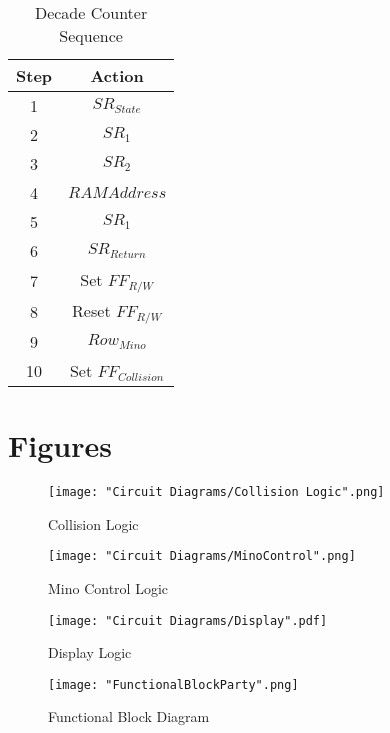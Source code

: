 \documentclass[letterpaper,titlepage,oneside]{article}
\begin{document}
\begin{table}[h!]

\begin{center}

\caption{Decade Counter Sequence}\label{table:Clock}
\begin{tabular}{|c|c|}

\hline 
\rule[-1ex]{0pt}{2.5ex} Step & Action \\ 
\hline 
\rule[-1ex]{0pt}{2.5ex} 1 & $SR_{State}$ \\ 
\hline 
\rule[-1ex]{0pt}{2.5ex} 2 & $SR_{1}$ \\ 
\hline 
\rule[-1ex]{0pt}{2.5ex} 3 & $SR_{2}$ \\ 
\hline 
\rule[-1ex]{0pt}{2.5ex} 4 & $RAM Address$ \\ 
\hline 
\rule[-1ex]{0pt}{2.5ex} 5 & $SR_{1}$ \\ 
\hline 
\rule[-1ex]{0pt}{2.5ex} 6 & $SR_{Return}$ \\ 
\hline 
\rule[-1ex]{0pt}{2.5ex} 7 & Set $FF_{R/W}$ \\ 
\hline 
\rule[-1ex]{0pt}{2.5ex} 8 & Reset $FF_{R/W}$ \\ 
\hline 
\rule[-1ex]{0pt}{2.5ex} 9 & $Row_{Mino}$ \\ 
\hline 
\rule[-1ex]{0pt}{2.5ex} 10 & Set $FF_{Collision}$ \\ 
\hline 


\end{tabular} 
\end{center}
\end{table}


\clearpage
\section{Figures}
\begin{figure}[h!]
\begin{center}
\texttt{[image: "Circuit Diagrams/Collision Logic".png]}
\caption{Collision Logic}
\label{fig:Collision}
\end{center}
\end{figure}

\begin{figure}[h!]
\begin{center}
\texttt{[image: "Circuit Diagrams/MinoControl".png]}
\caption{Mino Control Logic}
\label{fig:Mino Control}
\end{center}
\end{figure}

\begin{figure}[h!]
\begin{center}
\texttt{[image: "Circuit Diagrams/Display".pdf]}
\caption{Display Logic}
\label{fig:Display}
\end{center}
\end{figure}

\begin{figure}[h!]
\begin{center}
\texttt{[image: "FunctionalBlockParty".png]}
\caption{Functional Block Diagram}
\label{fig:block}
\end{center}
\end{figure}

\clearpage
\end{document}
